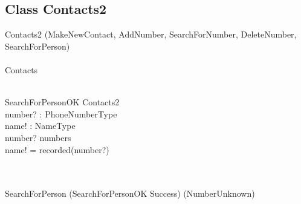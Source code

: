 \documentclass[12pt]{article}
\begin{document}
\begin{spacing}{1.5}
\subsection{Class Contacts2}
\begin{class}{Contacts2}
\also
\upharpoonright (MakeNewContact, AddNumber, SearchForNumber, DeleteNumber, \\
SearchForPerson) 
\\~\\ Contacts  \\~\\
\begin{op}{SearchForPersonOK}
\Xi Contacts2\\
number? : PhoneNumberType\\
name! : NameType\\
\ST
number? \in numbers\\
name! = recorded(number?)
\end{op}\\
\mbox{}\\
SearchForPerson \sdef (SearchForPersonOK \land Success) \oplus (NumberUnknown)  \\
\mbox{}\\
\end{class}


\end{spacing}
\end{document}
